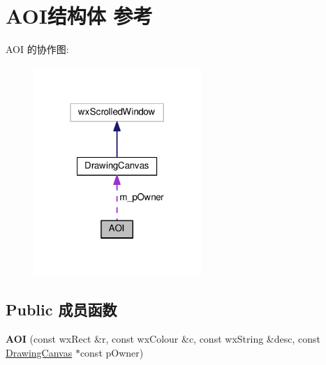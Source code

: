 \hypertarget{struct_a_o_i}{\section{A\+O\+I结构体 参考}
\label{struct_a_o_i}
}


A\+O\+I 的协作图\+:
\nopagebreak
\begin{figure}[H]
\begin{center}
\leavevmode
\includegraphics[width=181pt]{struct_a_o_i__coll__graph}
\end{center}
\end{figure}
\subsection*{Public 成员函数}
\begin{DoxyCompactItemize}
\item 
\hypertarget{struct_a_o_i_a85eb3bf8a3a27590c885d070fc7a2ae3}{{\bfseries A\+O\+I} (const wx\+Rect \&r, const wx\+Colour \&c, const wx\+String \&desc, const \hyperlink{class_drawing_canvas}{Drawing\+Canvas} $\ast$const p\+Owner)}\label{struct_a_o_i_a85eb3bf8a3a27590c885d070fc7a2ae3}

\end{DoxyCompactItemize}
